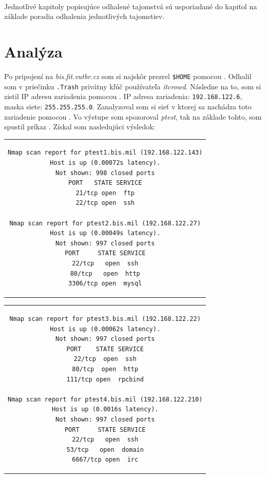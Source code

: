 \documentclass[11pt,a4paper]{article}
\begin{document}
\hfill\\

Jednotlivé kapitoly popisujúce odhalené tajomstvá sú usporiadané do kapitol na základe poradia odhalenia jednotlivých tajomstiev.

\section{Analýza}\label{sec:analysis}

Po pripojení na \textit{bis.fit.vutbr.cz} som si najskôr prezrel \texttt{\$HOME} pomocou . Odhalil som v priečinku \texttt{.Trash} privátny kľúč používateľa \textit{itcrowd}. Následne na to, som si zistil IP adresu zariadenia pomocou . IP adresa zariadenia: \texttt{192.168.122.6}, maska siete: \texttt{255.255.255.0}. Zanalyzoval som si sieť v ktorej sa nachádza toto zariadenie pomocou . Vo výstupe som spozoroval \textit{ptest}, tak na základe tohto, som spustil príkaz . Získal som nasledujúci výsledok:

\begin{center}
\begin{tabular}{c}
\begin{lstlisting}[basicstyle=\small]
Nmap scan report for ptest1.bis.mil (192.168.122.143)
Host is up (0.00072s latency).
Not shown: 998 closed ports
PORT   STATE SERVICE
21/tcp open  ftp
22/tcp open  ssh

Nmap scan report for ptest2.bis.mil (192.168.122.27)
Host is up (0.00049s latency).
Not shown: 997 closed ports
PORT     STATE SERVICE
22/tcp   open  ssh
80/tcp   open  http
3306/tcp open  mysql
\end{lstlisting}
\end{tabular}
\end{center}

\begin{center}
\begin{tabular}{c}
\begin{lstlisting}[basicstyle=\small]
Nmap scan report for ptest3.bis.mil (192.168.122.22)
Host is up (0.00062s latency).
Not shown: 997 closed ports
PORT    STATE SERVICE
22/tcp  open  ssh
80/tcp  open  http
111/tcp open  rpcbind

Nmap scan report for ptest4.bis.mil (192.168.122.210)
Host is up (0.0016s latency).
Not shown: 997 closed ports
PORT     STATE SERVICE
22/tcp   open  ssh
53/tcp   open  domain
6667/tcp open  irc
\end{lstlisting}
\end{tabular}
\end{center}
\end{document}
